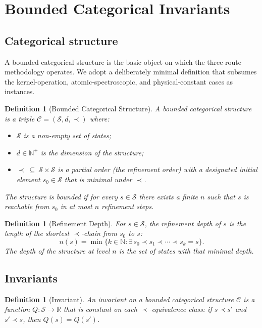 \documentclass[twocolumn,11pt,a4paper]{article}
\newtheorem{definition}[theorem]{Definition}
\newcommand{\Real}{\mathbb{R}}
\newcommand{\Natural}{\mathbb{N}}
\newcommand{\Inv}{Q}
\newcommand{\StateS}{\mathcal{S}}
\newcommand{\Depth}{n}
\newcommand{\Dim}{d}
\begin{document}
\section{Bounded Categorical Invariants}
\label{sec:invariants}

\subsection{Categorical structure}

A bounded categorical structure is the basic object on which the three-route methodology operates. We adopt a deliberately minimal definition that subsumes the kernel-operation, atomic-spectroscopic, and physical-constant cases as instances.

\begin{definition}[Bounded Categorical Structure]
\label{def:cat-structure}
A \emph{bounded categorical structure} is a triple $\mathcal{C} = (\StateS, \Dim, \prec)$ where:
\begin{itemize}[nosep,leftmargin=*]
\item $\StateS$ is a non-empty set of \emph{states};
\item $\Dim \in \Natural^+$ is the \emph{dimension} of the structure;
\item $\prec\ \subseteq\ \StateS \times \StateS$ is a partial order (the \emph{refinement order}) with a designated initial element $s_0 \in \StateS$ that is minimal under $\prec$.
\end{itemize}
The structure is \emph{bounded} if for every $s \in \StateS$ there exists a finite $\Depth$ such that $s$ is reachable from $s_0$ in at most $\Depth$ refinement steps.
\end{definition}

\begin{definition}[Refinement Depth]
\label{def:depth}
For $s \in \StateS$, the \emph{refinement depth} of $s$ is the length of the shortest $\prec$-chain from $s_0$ to $s$:
\[
\Depth(s) = \min\{k \in \Natural : \exists\, s_0 \prec s_1 \prec \cdots \prec s_k = s\}.
\]
The depth of the structure at level $\Depth$ is the set of states with that minimal depth.
\end{definition}

\subsection{Invariants}

\begin{definition}[Invariant]
\label{def:invariant}
An \emph{invariant} on a bounded categorical structure $\mathcal{C}$ is a function $\Inv : \StateS \to \Real$ that is constant on each $\prec$-equivalence class: if $s \prec s'$ and $s' \prec s$, then $\Inv(s) = \Inv(s')$.
\end{definition}
\end{document}
